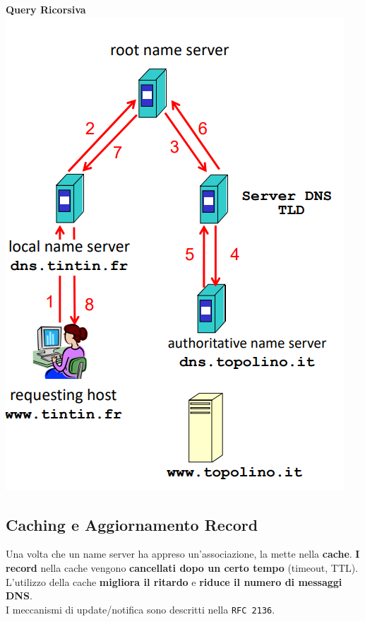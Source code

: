 \documentclass[10pt]{article}
\begin{document}
\begin{multicols}{2}
\textbf{Query Ricorsiva}\\
\includegraphics[scale=0.7]{dnsqueryricorsiva.png}
\end{multicols}
\pagebreak
\subsection{Caching e Aggiornamento Record}
Una volta che un name server ha appreso un'associazione, la mette nella \textbf{cache}. \textbf{I record} nella cache vengono \textbf{cancellati dopo un certo tempo} (timeout, TTL). L'utilizzo della cache \textbf{migliora il ritardo} e \textbf{riduce il numero di messaggi DNS}.\\
I meccanismi di update/notifica sono descritti nella \texttt{RFC 2136}.
\end{document}
